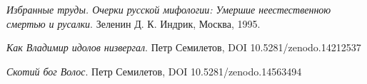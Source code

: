 \emph{Избранные труды. Очерки русской мифологии: Умершие неестественною смертью и русалки}. Зеленин Д. К. Индрик, Москва, 1995.

\emph{Как Владимир идолов низвергал}. Петр Семилетов, DOI 10.5281/zenodo.14212537

\emph{Скотий бог Волос}. Петр Семилетов, DOI 10.5281/zenodo.14563494